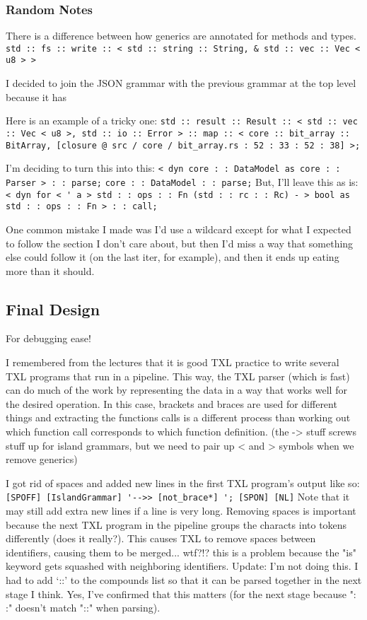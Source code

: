 \documentclass[11pt]{article}
\begin{document}
\subsubsection{Random Notes}

There is a difference between how generics are annotated for methods and types.
\lstinline{std :: fs :: write :: < std :: string :: String, & std :: vec :: Vec < u8 > >}

I decided to join the JSON grammar with the previous grammar at the top level because it has 

Here is an example of a tricky one:
\lstinline{std :: result :: Result :: < std :: vec :: Vec < u8 >, std :: io :: Error > :: map :: < core :: bit_array :: BitArray, [closure @ src / core / bit_array.rs : 52 : 33 : 52 : 38] >;}

I'm deciding to turn this into this:
\lstinline{< dyn core : : DataModel as core : : Parser > : : parse;}
\lstinline{core : : DataModel : : parse;}
But, I'll leave this as is:
\lstinline{< dyn for < ' a > std : : ops : : Fn (std : : rc : : Rc) - > bool as std : : ops : : Fn > : : call;}


One common mistake I made was I'd use a wildcard except for what I expected to follow the section I don't care about, but then I'd miss a way that something else could follow it (on the last iter, for example), and then it ends up eating more than it should.

\subsection{Final Design} %

For debugging ease!

I remembered from the lectures that it is good TXL practice to write several TXL programs that run in a pipeline.
This way, the TXL parser (which is fast) can do much of the work by representing the data in a way that works well for the desired operation.
In this case, brackets and braces are used for different things and extracting the functions calls is a different process than working out which function call corresponds to which function definition.
(the -> stuff screws stuff up for island grammars, but we need to pair up < and > symbols when we remove generics)

I got rid of spaces and added new lines in the first TXL program's output like so:
\lstinline{[SPOFF] [IslandGrammar] '-->> [not_brace*] '; [SPON] [NL]}
Note that it may still add extra new lines if a line is very long.
Removing spaces is important because the next TXL program in the pipeline groups the characts into tokens differently (does it really?).
This causes TXL to remove spaces between identifiers, causing them to be merged... wtf?!?
    this is a problem because the "is" keyword gets squashed with neighboring identifiers.
Update:
I'm not doing this.
I had to add `::' to the compounds list so that it can be parsed together in the next stage I think.
    Yes, I've confirmed that this matters (for the next stage because ": :" doesn't match "::" when parsing).
\end{document}
